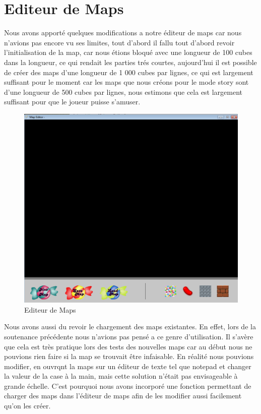 \documentclass [11pt]{report}
\begin{document}
	\section{Editeur de Maps}
		Nous avons apporté quelques modifications a notre éditeur de maps car nous n'avions pas encore vu ses limites, tout d'abord il fallu tout d'abord revoir l'initialisation de la map, car nous étions bloqué avec une longueur de 100 cubes dans la longueur, ce qui rendait les parties trés courtes, aujourd'hui il est possible de créer des maps d'une longueur de 1 000 cubes par lignes, ce qui est largement suffisant pour le moment car les maps que nous créons pour le mode story sont d'une longueur de 500 cubes par lignes, nous estimons que cela est largement suffisant pour que le joueur puisse s'amuser.\\
		
		\begin{figure}[h]
			\centering
			\includegraphics[width=0.7\linewidth]{./images/Editeur}
			\caption[Editeur de Maps]{Editeur de Maps}
			\label{fig:Editeur}
		\end{figure}
				
		\indent Nous avons aussi du revoir le chargement des maps existantes. En effet, lors de la soutenance précédente nous n'avions pas pensé a ce genre d'utilisation. Il s'avère que cela est très pratique lors des tests des nouvelles maps car au début nous ne pouvions rien faire si la map se trouvait \^etre infaisable. En réalité nous pouvions modifier, en ouvrqnt la maps sur un éditeur de texte tel que notepad et changer la valeur de la case \`a la main, mais cette solution n'était pas envisageable \`a grande échelle. C'est pourquoi nous avons incorporé une fonction permettant de charger des maps dans l'éditeur de maps afin de les modifier aussi facilement qu'on les créer.\\
		
\end{document}
